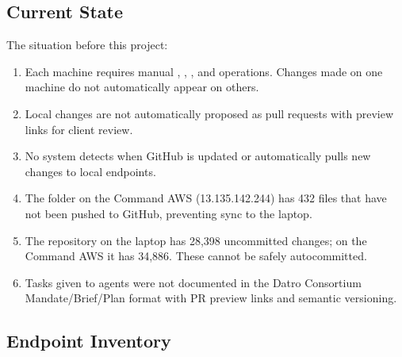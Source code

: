 \documentclass[letterpaper,10pt,openany,oneside,english]{sphinxmanual}
\begin{document}
\subsection{Current State}
\label{\detokenize{background:current-state}}
\sphinxAtStartPar
The situation before this project:
\begin{enumerate}
%
\item {} 
\sphinxAtStartPar
{} \textendash{} Each machine requires manual , , , and  operations. Changes made on one machine do not automatically appear on others.

\item {} 
\sphinxAtStartPar
{} \textendash{} Local changes are not automatically proposed as pull requests with preview links for client review.

\item {} 
\sphinxAtStartPar
{} \textendash{} No system detects when GitHub is updated or automatically pulls new changes to local endpoints.

\item {} 
\sphinxAtStartPar
{} \textendash{} The  folder on the Command AWS (13.135.142.244) has 432 files that have not been pushed to GitHub, preventing sync to the laptop.

\item {} 
\sphinxAtStartPar
{} \textendash{} The  repository on the laptop has 28,398 uncommitted changes; on the Command AWS it has 34,886. These cannot be safely auto\sphinxhyphen{}committed.

\item {} 
\sphinxAtStartPar
{} \textendash{} Tasks given to agents were not documented in the Datro Consortium Mandate/Brief/Plan format with PR preview links and semantic versioning.

\end{enumerate}


\subsection{Endpoint Inventory}
\label{\detokenize{background:endpoint-inventory}}
\sphinxstepscope
\end{document}

